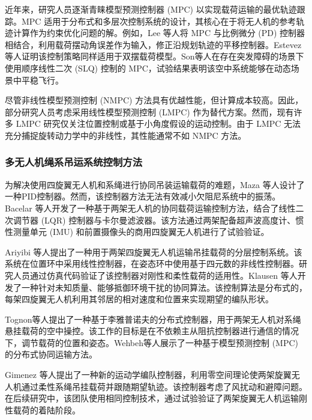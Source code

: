 \documentclass[lang=chs, degree=master, blindreview=true, winfonts=true]{yanputhesis}
\begin{document}
近年来，研究人员逐渐青睐模型预测控制器 (MPC) 以实现载荷运输的最优轨迹跟踪\cite{urbina2021predictive}。MPC 适用于分布式和多层次控制系统的设计，其核心在于将无人机的参考轨迹计算作为约束优化问题的解。例如，Lee 等人\cite{lee2015study}将 MPC 与比例微分 (PD) 控制器相结合，利用载荷摆动角误差作为输入，修正沿规划轨迹的平移控制器。Estevez 等人\cite{estevez2021hybrid}证明该控制策略同样适用于双摆载荷模型。Son等人\cite{son2018model}在存在突发障碍的场景下使用顺序线性二次 (SLQ) 控制的 MPC，试验结果表明该空中系统能够在动态场景中平稳飞行。

尽管非线性模型预测控制 (NMPC) 方法具有优越性能，但计算成本较高\cite{norouzi2022deep}。因此，部分研究人员考虑采用线性模型预测控制 (LMPC) 作为替代方案。然而，现有许多 LMPC 研究仅关注位置控制\cite{bangura2014real}或基于小角度假设的运动控制\cite{alexis2014trajectory}。由于 LMPC 无法充分捕捉旋转动力学中的非线性，其性能通常不如 NMPC 方法\cite{nguyen2021model}。

\subsubsection{多无人机绳系吊运系统控制方法}
为解决使用四旋翼无人机和系绳进行协同吊装运输载荷的难题，Maza 等人\cite{maza2010multi}设计了一种PID控制器。然而，该控制器方法无法有效减小欠阻尼系统中的振荡。Bacelar 等人\cite{bacelar2020board}开发了一种基于两架无人机的协同载荷运输控制方法，结合了线性二次调节器 (LQR) 控制器与卡尔曼滤波器。该方法通过两架配备超声波高度计、惯性测量单元 (IMU) 和前置摄像头的商用四旋翼无人机进行了试验验证。

Ariyibi 等人\cite{ariyibi2020quaternion}提出了一种用于两架四旋翼无人机运输吊挂载荷的分层控制系统。该系统在位置环中采用线性控制器，在姿态环中使用基于四元数的非线性控制器。研究人员通过仿真代码验证了该控制器对刚性和柔性载荷的适用性。Klausen 等人\cite{klausen2018cooperative}开发了一种针对未知质量、能够抵御环境干扰的协同算法。该控制算法是分布式的，每架四旋翼无人机利用其邻居的相对速度和位置来实现期望的编队形状。

Tognon等人\cite{tognon2018aerial}提出了一种基于李雅普诺夫的分布式控制器，用于两架无人机对系绳悬挂载荷的空中操控。该工作的目标是在不依赖主从阻抗控制器进行通信的情况下，调节载荷的位置和姿态。Wehbeh等人\cite{wehbeh2020distributed}展示了一种基于模型预测控制 (MPC) 的分布式协同运输方法。

Gimenez 等人\cite{gimenez2018multi}提出了一种新的运动学编队控制器，利用零空间理论使两架旋翼无人机通过柔性系绳吊挂载荷并跟随期望轨迹。该控制器考虑了风扰动和避障问题。在后续研究中，该团队使用相同控制技术，通过试验验证了两架旋翼无人机运输刚性载荷的着陆阶段\cite{gimenez2020control}。
\end{document}
